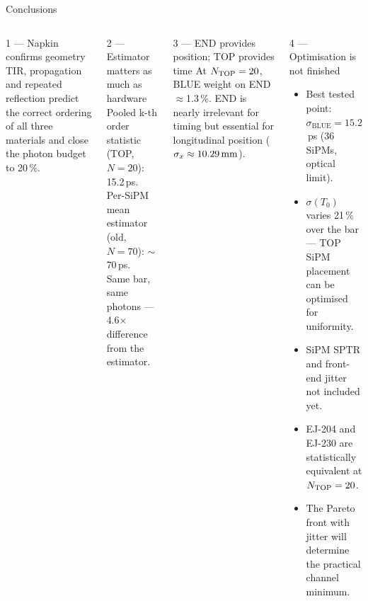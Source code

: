 \documentclass[aspectratio=169,9pt]{beamer}
\newcommand{\sigT}{\sigma(T_0)}
\newcommand{\sB}{\sigma_{\mathrm{BLUE}}}
\begin{document}
\begin{frame}{Conclusions}
  \begin{columns}[T]
      \begin{block}{1 — Napkin confirms geometry}
        {\small TIR, propagation and repeated reflection predict the correct ordering
        of all three materials and close the photon budget to 20\,\%.}
      \end{block}
      \vspace{3pt}
      \begin{block}{2 — Estimator matters as much as hardware}
        {\small Pooled k-th order statistic (TOP, $N=20$): 15.2\,ps.\\
        Per-SiPM mean estimator (old, $N=70$): $\sim$70\,ps.\\
        Same bar, same photons — 4.6$\times$ difference from the estimator.}
      \end{block}
      \vspace{3pt}
      \begin{block}{3 — END provides position; TOP provides time}
        {\small At $N_{\rm TOP}=20$, BLUE weight on END $\approx$1.3\,\%.
        END is nearly irrelevant for timing but essential for longitudinal position
        ($\sigma_x\approx10.29\,\text{mm}$).}
      \end{block}
      \begin{alertblock}{4 — Optimisation is not finished}
        {\small
        \begin{itemize}\setlength\itemsep{3pt}
          \item Best tested point: $\sB=15.2$\,ps (36 SiPMs, optical limit).
          \item $\sigT$ varies 21\,\% over the bar — TOP SiPM placement can be optimised for uniformity.
          \item SiPM SPTR and front-end jitter not included yet.
          \item EJ-204 and EJ-230 are statistically equivalent at $N_{\rm TOP}=20$.
          \item The Pareto front with jitter will determine the practical channel minimum.
        \end{itemize}}
      \end{alertblock}
  \end{columns}
\end{frame}

\appendix
\end{document}
